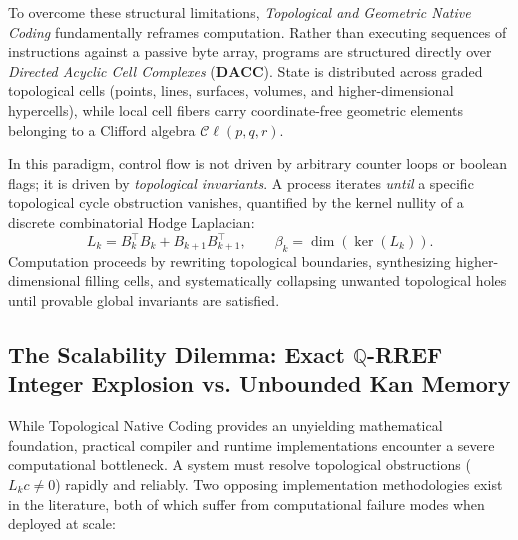 \documentclass[acmsmall,screen,nonacm]{acmart}
\newcommand{\Cl}{\mathcal{C}\ell}
\newcommand{\DACC}{\mathbf{DACC}}
\begin{document}
To overcome these structural limitations, \emph{Topological and Geometric Native Coding} fundamentally reframes computation. Rather than executing sequences of instructions against a passive byte array, programs are structured directly over \emph{Directed Acyclic Cell Complexes} ($\DACC$). State is distributed across graded topological cells (points, lines, surfaces, volumes, and higher-dimensional hypercells), while local cell fibers carry coordinate-free geometric elements belonging to a Clifford algebra $\Cl(p,q,r)$. 

In this paradigm, control flow is not driven by arbitrary counter loops or boolean flags; it is driven by \emph{topological invariants}. A process iterates \emph{until} a specific topological cycle obstruction vanishes, quantified by the kernel nullity of a discrete combinatorial Hodge Laplacian:
\[
  L_k = B_k^\top B_k + B_{k+1} B_{k+1}^\top, \qquad \beta_k = \dim(\ker(L_k)).
\]
Computation proceeds by rewriting topological boundaries, synthesizing higher-dimensional filling cells, and systematically collapsing unwanted topological holes until provable global invariants are satisfied.

\subsection{The Scalability Dilemma: Exact \texorpdfstring{$\mathbb{Q}$-RREF}{Q-RREF} Integer Explosion vs. Unbounded Kan Memory}
\label{sec:core-bottleneck}

While Topological Native Coding provides an unyielding mathematical foundation, practical compiler and runtime implementations encounter a severe computational bottleneck. A system must resolve topological obstructions ($L_k c \neq 0$) rapidly and reliably. Two opposing implementation methodologies exist in the literature, both of which suffer from computational failure modes when deployed at scale:
\end{document}
